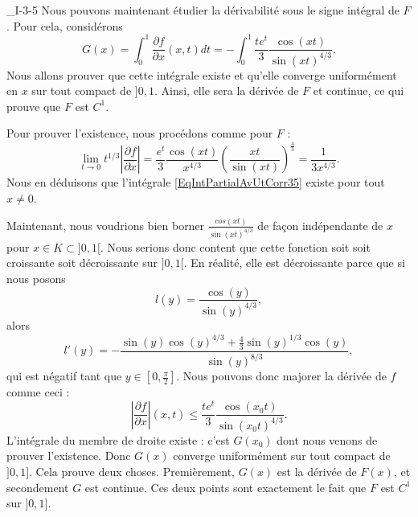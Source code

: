 \begin{corrige}{_I-3-5}
Nous pouvons maintenant étudier la dérivabilité sous le signe intégral de $F$. Pour cela, considérons
\begin{equation}		\label{EqIntPartialAvUtCorr35}
	G(x)=\int_0^1\frac{ \partial f }{ \partial x }(x,t)dt=-\int_0^1\frac{ t e^{t} }{ 3 }\frac{ \cos(xt) }{ \sin(xt)^{4/3} }.
\end{equation}
Nous allons prouver que cette intégrale existe et qu'elle converge uniformément en $x$ sur tout compact de $]0,1$. Ainsi, elle sera la dérivée de $F$ et continue, ce qui prouve que $F$ est $C^1$.

Pour prouver l'existence, nous procédons comme pour $F$ :
\begin{equation}
	\lim_{t\to 0}t^{1/3}\left| \frac{ \partial f }{ \partial x } \right| =\frac{ e^t }{ 3 }\frac{ \cos(xt) }{ x^{4/3} }\left( \frac{ xt }{ \sin(xt) } \right)^{\frac{ 4 }{ 3 }}=\frac{ 1 }{ 3x^{4/3} }.
\end{equation}
Nous en déduisons que l'intégrale \eqref{EqIntPartialAvUtCorr35} existe pour tout $x\neq 0$.

Maintenant, nous voudrions bien borner $\frac{ cos(xt) }{ \sin(xt)^{4/3} }$ de façon indépendante de $x$ pour $x\in K\subset ]0,1[$. Nous serions donc content que cette fonction soit soit croissante soit décroissante sur $]0,1[$. En réalité, elle est décroissante parce que si nous posons
\begin{equation}
		l(y)=\frac{ \cos(y) }{ \sin(y)^{4/3} },
\end{equation}
alors 
\begin{equation}
	l'(y)=-\frac{ \sin(y)\cos(y)^{4/3}+\frac{ 4 }{ 3 }\sin(y)^{1/3}\cos(y) }{ \sin(y)^{8/3} },
\end{equation}
qui est négatif tant que $y\in[0,\frac{ \pi }{ 2 }]$. Nous pouvons donc majorer la dérivée de $f$ comme ceci :
\begin{equation}
	\left| \frac{ \partial f }{ \partial x } \right| (x,t)\leq\frac{ te^t }{ 3 }\frac{ \cos(x_0t) }{ \sin(x_0t)^{4/3} }.
\end{equation}
L'intégrale du membre de droite existe : c'est $G(x_0)$ dont nous venons de prouver l'existence. Donc $G(x)$ converge uniformément sur tout compact de $]0,1]$. Cela prouve deux choses. Premièrement, $G(x)$ est la dérivée de $F(x)$, et secondement $G$ est continue. Ces deux points sont exactement le fait que $F$ est $C^1$ sur $]0,1]$.

\end{corrige}
